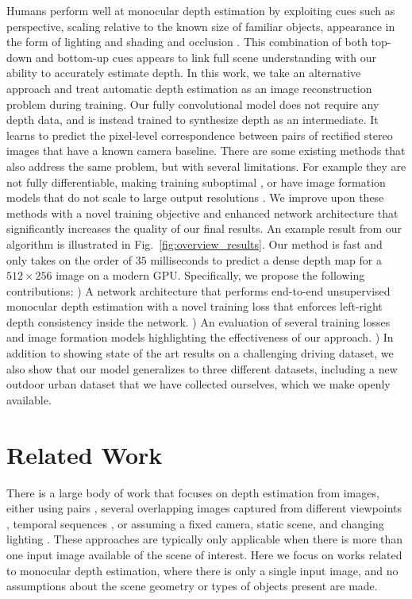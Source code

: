 \documentclass[10pt,twocolumn,letterpaper]{article}
\begin{document}
Humans perform well at monocular depth estimation by exploiting cues such as perspective, scaling relative to the known size of familiar objects, appearance in the form of lighting and shading and occlusion \cite{howard2012perceiving}.
This combination of both top-down and bottom-up cues appears to link full scene understanding with our ability to accurately estimate depth.  
In this work, we take an alternative approach and treat automatic depth estimation as an image reconstruction problem during training.
Our fully convolutional model does not require any depth data, and is instead trained to synthesize depth as an intermediate. It learns to predict the pixel-level correspondence between pairs of rectified stereo images that have a known camera baseline.
There are some existing methods that also address the same problem, but with several limitations. For example they are not fully differentiable, making training suboptimal \cite{garg2016unsupervised}, or have image formation models that do not scale to large output resolutions \cite{xie2016deep3d}.
We improve upon these methods with a novel training objective and enhanced network architecture that significantly increases the quality of our final results. 
An example result from our algorithm is illustrated in Fig.~\ref{fig:overview_results}. 
Our method is fast and only takes on the order of $35$ milliseconds to predict a dense depth map for a $512\times 256$ image on a modern GPU.
Specifically, we propose the following contributions:
) A network architecture that performs end-to-end unsupervised monocular depth estimation with a novel training loss that enforces left-right depth consistency inside the network.
) An evaluation of several training losses and image formation models highlighting the effectiveness of our approach.
) In addition to showing state of the art results on a challenging driving dataset, we also show that our model generalizes to three different datasets, including a new outdoor urban dataset that we have collected ourselves, which we make openly available.
\section{Related Work}
There is a large body of work that focuses on depth estimation from images, either using pairs \cite{scharstein2002taxonomy}, several overlapping images captured from different viewpoints \cite{furukawa2015multi}, temporal sequences \cite{ranftldense}, or assuming a fixed camera, static scene, and changing lighting \cite{woodham1980photometric, abrams2012heliometric}.
These approaches are typically only applicable when there is more than one input image available of the scene of interest. 
Here we focus on works related to monocular depth estimation, where there is only a single input image, and no assumptions about the scene geometry or types of objects present are made. 
\end{document}
